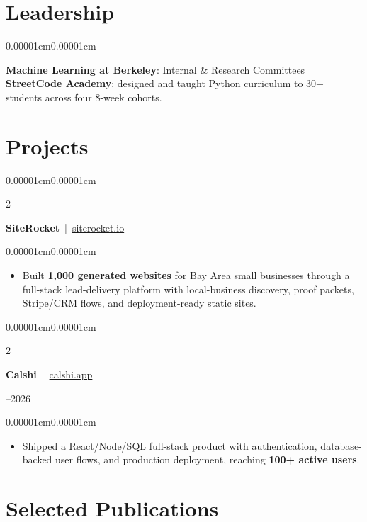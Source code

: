 \documentclass[10pt, letterpaper]{article}
\newenvironment{highlights}{
  \begin{itemize}[topsep=0.04cm, parsep=0.02cm, partopsep=0pt, itemsep=0pt, leftmargin=10pt]
}{
  \end{itemize}
}
\newenvironment{onecolentry}{
  \begin{adjustwidth}{0.00001cm}{0.00001cm}
}{
  \end{adjustwidth}
}
\newenvironment{twocolentry}[2][]{
  \onecolentry
  \def\secondColumn{#2}
  \setcolumnwidth{\fill,4.5cm}
  \begin{paracol}{2}
}{
  \switchcolumn \raggedleft \secondColumn
  \end{paracol}
  \endonecolentry
}
\begin{document}
  \section{Leadership}
  \begin{onecolentry}
    \small \textbf{Machine Learning at Berkeley}: Internal \& Research Committees\\[-1pt]
    \small \textbf{StreetCode Academy}: designed and taught Python curriculum to 30+ students across four 8-week cohorts.
  \end{onecolentry}

  \section{Projects}

  \begin{twocolentry}{2026}
    \textbf{SiteRocket} \,|\, \href{https://www.siterocket.io}{siterocket.io}
  \end{twocolentry}
  \begin{onecolentry}
    \begin{highlights}
      \item Built \textbf{1,000 generated websites} for Bay Area small businesses through a full-stack lead-delivery platform with local-business discovery, proof packets, Stripe/CRM flows, and deployment-ready static sites.
    \end{highlights}
  \end{onecolentry}

  \begin{twocolentry}{2025--2026}
    \textbf{Calshi} \,|\, \href{https://calshi.app}{calshi.app}
  \end{twocolentry}
  \begin{onecolentry}
    \begin{highlights}
      \item Shipped a React/Node/SQL full-stack product with authentication, database-backed user flows, and production deployment, reaching \textbf{100+ active users}.
    \end{highlights}
  \end{onecolentry}

  \section{Selected Publications}
\end{document}

